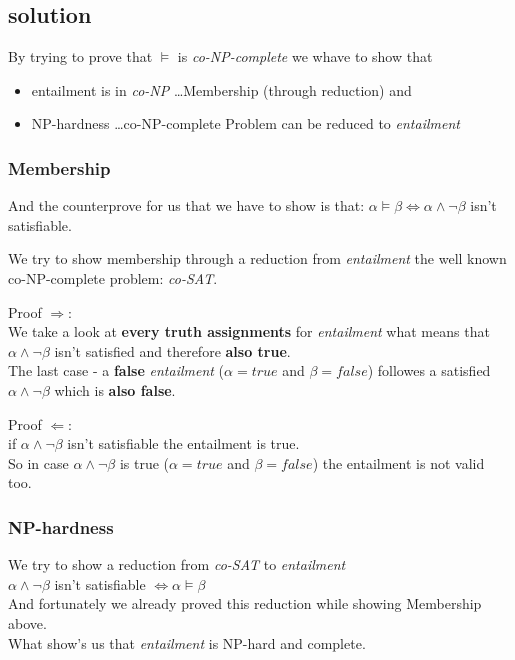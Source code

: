 \subsection{solution}

By trying to prove that $\vDash$ is \textit{co-NP-complete} we whave to show that
\begin{itemize}
 \item entailment is in \textit{co-NP} \dots Membership (through reduction) and
 \item NP-hardness \dots co-NP-complete Problem can be reduced to \textit{entailment}
\end{itemize}

\subsubsection{Membership}
And the counterprove for us that we have to show is that:
$\alpha \vDash \beta \iff \alpha \wedge \neg\beta$ isn't satisfiable.

\noindent We try to show membership through a reduction from \textit{entailment} the well known 
co-NP-complete problem: \textit{co-SAT}.\newline

\noindent Proof $\Rightarrow$:\\
We take a look at \textbf{every truth assignments} for \textit{entailment} what means 
that $\alpha \wedge \neg\beta$ isn't satisfied and therefore \textbf{also true}. \\
The last case - a \textbf{false} \textit{entailment} ($\alpha = true$ and $\beta = false$) 
followes a satisfied $\alpha \wedge \neg\beta$ which is \textbf{also false}.

\noindent Proof $\Leftarrow$:\\
if $\alpha \wedge \neg\beta$ isn't satisfiable the entailment is true.\\
So in case $\alpha \wedge \neg\beta$ is true ($\alpha = true$ and $\beta = false$)
the entailment is not valid too.

\subsubsection{NP-hardness}
We try to show a reduction from \textit{co-SAT} to \textit{entailment}\\

$\alpha \wedge \neg\beta$ isn't satisfiable $\iff \alpha \vDash \beta$\\
And fortunately we already proved this reduction while showing Membership above.\\

\noindent What show's us that \textit{entailment} is NP-hard and complete.